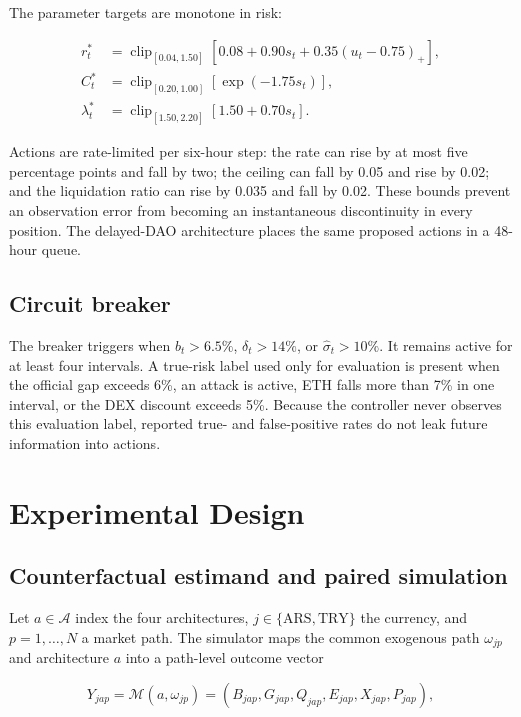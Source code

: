 \documentclass[sn-vancouver,Numbered]{sn-jnl}
\newcommand{\clip}{\operatorname{clip}}
\begin{document}
The parameter targets are monotone in risk:

\begin{align}
 r_t^*&=\clip_{[0.04,1.50]}\left[0.08+0.90s_t+0.35(u_t-0.75)_+\right],\\
 C_t^*&=\clip_{[0.20,1.00]}\left[\exp(-1.75s_t)\right],\\
 \lambda_t^*&=\clip_{[1.50,2.20]}\left[1.50+0.70s_t\right].
 \label{eq:targets}
\end{align}

Actions are rate-limited per six-hour step: the rate can rise by at most five percentage points and fall by two; the ceiling can fall by 0.05 and rise by 0.02; and the liquidation ratio can rise by 0.035 and fall by 0.02. These bounds prevent an observation error from becoming an instantaneous discontinuity in every position. The delayed-DAO architecture places the same proposed actions in a 48-hour queue.

\subsection{Circuit breaker}

The breaker triggers when $b_t>6.5\%$, $\delta_t>14\%$, or $\widehat\sigma_t>10\%$. It remains active for at least four intervals. A true-risk label used only for evaluation is present when the official gap exceeds 6\%, an attack is active, ETH falls more than 7\% in one interval, or the DEX discount exceeds 5\%. Because the controller never observes this evaluation label, reported true- and false-positive rates do not leak future information into actions.

\section{Experimental Design}\label{sec:experiments}

\subsection{Counterfactual estimand and paired simulation}

Let $a\in\mathcal{A}$ index the four architectures, $j\in\{\mathrm{ARS},\mathrm{TRY}\}$ the currency, and $p=1,\ldots,N$ a market path. The simulator maps the common exogenous path $\omega_{jp}$ and architecture $a$ into a path-level outcome vector

\begin{equation}
 Y_{jap}=\mathcal{M}(a,\omega_{jp})=
 \left(B_{jap},G_{jap},Q_{jap},E_{jap},X_{jap},P_{jap}\right),
 \label{eq:estimand-map}
\end{equation}
\end{document}
